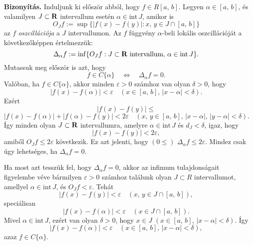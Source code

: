 
\textbf{Bizonyítás.} Induljunk ki először abból, hogy $f \in 
R[a, \, b]$. Legyen $\alpha \in [a, \, b]$, és valamilyen $J \subset \mathbf{R}$ intervallum esetén $\alpha \in \text{int} \, J$, amikor is
\[
	O_Jf := \sup \big\{ |f(x) - f(y)| : x, \, y \in J \cap [a, \, b] \big\}
\]
az $f$ \textit{oszcillációja} a $J$ intervallumon. Az $f$ függvény $\alpha$-beli lokális oszcillációját a következőképpen értelmezzük:
\[
	\Delta_\alpha f := \inf \{ O_Jf : J \subset \mathbf{R} \text{ intervallum}, \, \alpha \in \text{int} \, J\}.
\]
Mutassuk meg először is azt, hogy
\[
	f \in C\{\alpha\} \quad \Longleftrightarrow \quad \Delta_\alpha f = 0.
\]
Valóban, ha $f \in C\{\alpha\}$, akkor minden $\varepsilon > 0$ számhoz van olyan $\delta > 0$, hogy
\[
	|f(x) - f(\alpha)| < \varepsilon \quad (x \in [a, \, b], \, |x - \alpha| < \delta).
\]
Ezért
\[
	|f(x) - f(y)| \leq
\]
\[
	|f(x) - f(\alpha)| + |f(\alpha) - f(y)| < 2\varepsilon \quad (x, \, y \in [a, \, b], \, |x - \alpha|, \, |y - \alpha| < \delta).
\]
Így minden olyan $J \subset \mathbf{R}$ intervallumra, amelyre $\alpha \in \text{int} \, J$ és $d_J < \delta$, igaz, hogy
\[
	|f(x) - f(y)| < 2\varepsilon,
\]
amiből $O_Jf \leq 2\varepsilon$ következik. Ez azt jelenti, hogy $(0 \leq) \, \, \Delta_\alpha f \leq 2\varepsilon$. Mindez csak úgy lehetséges, ha $\Delta_\alpha f = 0$.

Ha most azt tesszük fel, hogy $\Delta_\alpha f = 0$, akkor az infimum tulajdonságait figyelembe véve bármilyen $\varepsilon > 0$ számhoz találunk olyan $J \subset R$ intervallumot, amellyel $\alpha \in \text{int} \, J$, és $O_J f < \varepsilon$. Tehát
\[
	|f(x) - f(y)| < \varepsilon \quad (x, \, y \in J \cap [a, \, b]),
\]
speciálisan
\[
	|f(x) - f(\alpha)| < \varepsilon \quad (x \in J \cap [a, \, b]).
\]
Mivel $\alpha \in \text{int} \, J$, ezért van olyan $\delta > 0$, hogy $x \in J \, \, (x \in [a, \, b], \, |x - \alpha| < \delta)$. Így
\[
	|f(x) - f(\alpha)| < \varepsilon \quad (x \in [a, \, b], \, |x - \alpha| < \delta),
\]
azaz $f \in C\{\alpha\}$.


